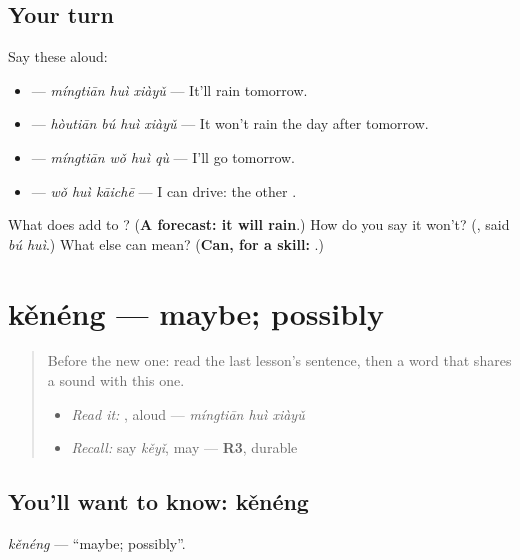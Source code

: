 \subsection*{Your turn}
Say these aloud:

\begin{itemize}
\raggedright
  \item {} — \emph{míngtiān huì xiàyǔ} — It'll rain tomorrow.
  \item {} — \emph{hòutiān bú huì xiàyǔ} — It won't rain the day after tomorrow.
  \item {} — \emph{míngtiān wǒ huì qù} — I'll go tomorrow.
  \item {} — \emph{wǒ huì kāichē} — I can drive: the other .
\end{itemize}

\begin{tcolorbox}[breakable,colback=teal!4,colframe=teal!35!black,title={Before you move on}]
What does  add to ? (\textbf{A forecast: it will rain}.) How do you say it won't? (\textbf{}, said \emph{bú huì}.) What else can  mean? (\textbf{Can, for a skill: }.)
\end{tcolorbox}
\section[kěnéng]{kěnéng — maybe; possibly}

\label{lesson:ZH-C147-keneng}



\begin{quote}
Before the new one: read the last lesson's sentence, then a word that shares a sound with this one.

\begin{itemize}
\raggedright
  \item \emph{Read it:} , aloud — \emph{míngtiān huì xiàyǔ}
  \item \emph{Recall:} say \emph{kěyǐ}, may — \textbf{R3}, durable
\end{itemize}
\end{quote}

\subsection*{You'll want to know: kěnéng}
\emph{kěnéng} — \textquotedblleft{}maybe; possibly\textquotedblright{}.


